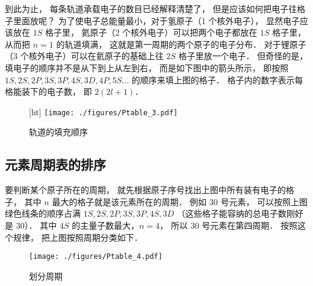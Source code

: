 到此为止， 每条轨道承载电子的数目已经解释清楚了， 但是应该如何把电子往格子里面放呢？ 为了使电子总能量最小，对于氢原子（1 个核外电子）， 显然电子应该放在 $1S$ 格子里， 氦原子（2 个核外电子）可以把两个电子都放在 $1S$ 格子里， 从而把 $n=1$ 的轨道填满， 这就是第一周期的两个原子的电子分布． 对于锂原子（3 个核外电子）可以在氦原子的基础上往 $2S$ 格子里放一个电子． 但奇怪的是， 填电子的顺序并不是从下到上从左到右， 而是如下图中的箭头所示， 即按照 $1S, 2S, 2P, 3S, 3P, 4S, 3D, 4P, 5S\dots$ 的顺序来填上图的格子． 格子内的数字表示每格能装下的电子数， 即 $2(2l + 1)$．
\begin{figure}\label{Ptable_fig2}[ht]
\centering
\texttt{[image: ./figures/Ptable\_3.pdf]}
\caption{轨道的填充顺序} 
\end{figure}

\subsection{元素周期表的排序}

要判断某个原子所在的周期， 就先根据原子序号找出上图中所有装有电子的格子， 其中 $n$ 最大的格子就是该元素所在的周期． 例如 30 号元素， 可以按照上图绿色线条的顺序占满 $1S, 2S, 2P, 3S, 3P, 4S, 3D$ （这些格子能容纳的总电子数刚好是 30）． 其中 $4S$ 的主量子数最大，$n=4$， 所以 30 号元素在第四周期． 按照这个规律， 把上图按照周期分类如下．
\begin{figure}[ht]
\centering
\texttt{[image: ./figures/Ptable\_4.pdf]}
\caption{划分周期} 
\end{figure}

